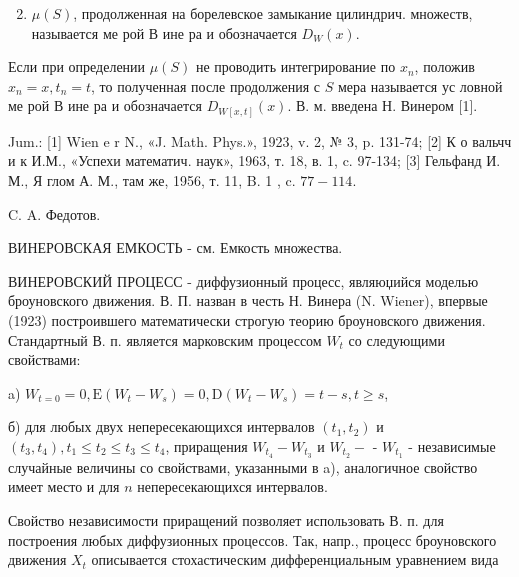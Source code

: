 \documentclass[10pt]{article}
\begin{document}
\begin{enumerate}

  \setcounter{enumi}{1}

  \item $\mu(S)$, продолженная на борелевское замыкание цилиндрич. множеств, называется ме рой В ине ра и обозначается $D_{W}(x)$.

\end{enumerate}



Если при определении $\mu(S)$ не проводить интегрирование по $x_{n}$, положив $x_{n}=x, t_{n}=t$, то полученная после продолжения с $S$ мера называется ус ловной ме рой В ине ра и обозначается $D_{W[x, t]}(x)$. В. м. введена Н. Винером [1].



Jum.: [1] Wien e r N., «J. Math. Phys.», 1923, v. 2, № 3, p. 131-74; [2] К о вальчч и к И.М., «Успехи математич. наук», 1963, т. 18, в. 1, c. 97-134; [3] Гельфанд И. М., Я глом А. М., там же, 1956, т. 11, B. 1 , c. $77-114$.



C. A. Федотов.



ВИНЕРОВСКАЯ ЕМКОСТЬ - см. Емкость множества.



ВИНЕРОВСКИЙ ПРОЦЕСС - диффузионный процесс, являюџийся моделью броуновского движения. В. П. назван в честь Н. Винера (N. Wiener), впервые (1923) построившего математически строгую теорию броуновского движения. Стандартный В. п. является марковским процессом $W_{t}$ со следующими свойствами:



a) $W_{t=0}=0, \mathrm{E}\left(W_{t}-W_{s}\right)=0, \mathrm{D}\left(W_{t}-W_{s}\right)=t-s, t \geqslant s$,



б) для любых двух непересекающихся интервалов $\left(t_{1}, t_{2}\right)$ и $\left(t_{3}, t_{4}\right), t_{1} \leqslant t_{2} \leqslant t_{3} \leqslant t_{4}$, приращения $W_{t_{4}}-W_{t_{3}}$ и $W_{t_{2}}-$ - $W_{t_{1}}$ - независимые случайные величины со свойствами, указанными в a), аналогичное свойство имеет место и для $n$ непересекающихся интервалов.



Свойство независимости приращений позволяет использовать В. п. для построения любых диффузионных процессов. Так, напр., процесс броуновского движения $X_{t}$ описывается стохастическим дифференциальным уравнением вида
\end{document}
